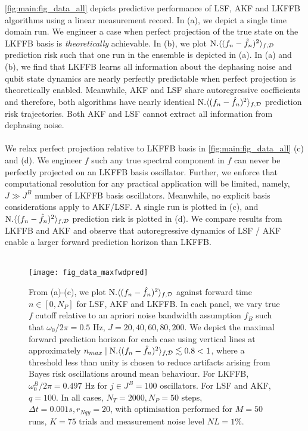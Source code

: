 \cref{fig:main:fig_data_all} depicts predictive performance of LSF, AKF and LKFFB algorithms using a linear measurement record. In (a), we depict a single time domain run. We engineer a case when perfect projection of the true state on the LKFFB basis is \textit{theoretically} achievable. In (b), we plot $\text{N.} \langle (f_n - \hat{f}_n)^2 \rangle_{f, \mathcal{D}}$ prediction risk such that one run in the ensemble is depicted in (a).  In (a) and (b), we find that LKFFB learns all information about the dephasing noise and qubit state dynamics are nearly perfectly predictable when perfect projection is theoretically enabled. Meanwhile, AKF and LSF share autoregressive coefficients and therefore, both algorithms have nearly identical $\text{N.} \langle (f_n - \hat{f}_n)^2 \rangle_{f, \mathcal{D}}$ prediction risk trajectories. Both AKF and LSF cannot extract all information from dephasing noise.
\\
\\
We relax perfect projection relative to LKFFB basis in \cref{fig:main:fig_data_all}  (c) and (d). We engineer $f$ such any true spectral component in $f$ can never be perfectly projected on an LKFFB basis oscillator. Further, we enforce that  computational resolution for any practical application will be limited, namely, $J \gg J^B$ number of LKFFB basis oscillators. Meanwhile, no explicit basis considerations apply to AKF/LSF. A single run is plotted in (c), and $\text{N.} \langle (f_n - \hat{f}_n)^2 \rangle_{f, \mathcal{D}}$ prediction risk is plotted in (d). We compare results from LKFFB and AKF and observe that autoregressive dynamics of LSF / AKF enable a larger forward prediction horizon than LKFFB. 
\\
\\
\begin{figure}
    \texttt{[image: fig\_data\_maxfwdpred]}
    \caption{\label{fig:main:fig_data_maxfwdpred} From (a)-(c), we plot $\text{N.} \langle (f_n - \hat{f}_n)^2 \rangle_{f, \mathcal{D}}$ against forward time $n \in [0, N_P]$ for LSF, AKF and LKFFB. In each panel, we vary true $f$ cutoff relative to an apriori noise bandwidth assumption $f_B$ such that $\omega_0 / 2\pi = 0.5$ Hz, $J = 20, 40, 60, 80, 200$. We depict the maximal forward prediction horizon for each case using vertical lines at approximately $ n_{max} \mid  \text{N.} \langle (f_n - \hat{f}_n)^2 \rangle_{f, \mathcal{D}} \lesssim 0.8 < 1$, where a threshold less than unity is chosen to reduce artifacts arising from Bayes risk oscillations around mean behaviour. For LKFFB, $\omega_0^B / 2\pi = 0.497$ Hz for $j \in J^B = 100$ oscillators. For LSF and AKF, $q = 100$. In all cases,  $N_T = 2000, N_P = 50$ steps, $\Delta t = 0.001s, r_{Nqy}=20$, with optimisation performed for $M=50$ runs, $K=75$ trials and measurement noise level $NL = 1\%$.} 
\end{figure} 
